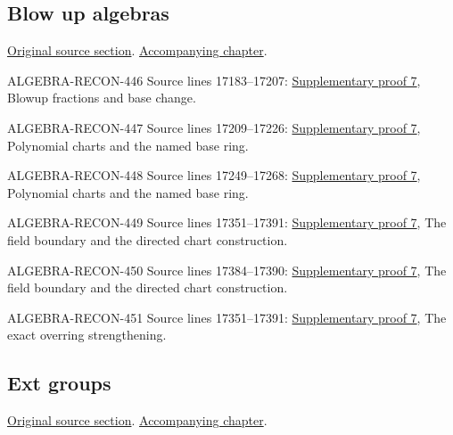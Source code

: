 \subsection{Blow up algebras}
\hypertarget{algebra-source-section-blow-up}{}
\noindent\href{https://github.com/stacks/stacks-project/blob/a04446e57ec1fbc252a871afcec7752fb2807b14/algebra.tex\#L17136}{Original source section}. \href{algebra.pdf\#nameddest=section-blow-up}{Accompanying chapter}.

\begin{AlgebraSourceRoutes}
\item[ALGEBRA-RECON-446] Source lines 17183--17207: \hyperlink{algebra_blowup_ext_depth_notes_20260927}{Supplementary proof 7}, Blowup fractions and base change.
\item[ALGEBRA-RECON-447] Source lines 17209--17226: \hyperlink{algebra_blowup_ext_depth_notes_20260927}{Supplementary proof 7}, Polynomial charts and the named base ring.
\item[ALGEBRA-RECON-448] Source lines 17249--17268: \hyperlink{algebra_blowup_ext_depth_notes_20260927}{Supplementary proof 7}, Polynomial charts and the named base ring.
\item[ALGEBRA-RECON-449] Source lines 17351--17391: \hyperlink{algebra_blowup_ext_depth_notes_20260927}{Supplementary proof 7}, The field boundary and the directed chart construction.
\item[ALGEBRA-RECON-450] Source lines 17384--17390: \hyperlink{algebra_blowup_ext_depth_notes_20260927}{Supplementary proof 7}, The field boundary and the directed chart construction.
\item[ALGEBRA-RECON-451] Source lines 17351--17391: \hyperlink{algebra_blowup_ext_depth_notes_20260927}{Supplementary proof 7}, The exact overring strengthening.
\end{AlgebraSourceRoutes}

\subsection{Ext groups}
\hypertarget{algebra-source-section-ext}{}
\noindent\href{https://github.com/stacks/stacks-project/blob/a04446e57ec1fbc252a871afcec7752fb2807b14/algebra.tex\#L17402}{Original source section}. \href{algebra.pdf\#nameddest=section-ext}{Accompanying chapter}.


